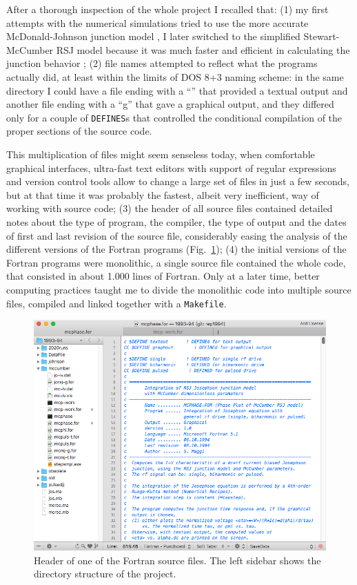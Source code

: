 After a thorough inspection of the whole project I recalled that:
(1) my first attempts with the numerical simulations tried to use the more accurate McDonald-Johnson junction model \cite{McDonald:1976}, I later switched to the simplified Stewart-McCumber RSJ model because it was much faster and efficient in calculating the junction behavior \cite{McCumber:1968, Stewart:1974};
(2) file names attempted to reflect what the programs actually did, at least within the limits of DOS 8+3 naming scheme: in the same directory I could have a file ending with a ``'' that provided a textual output and another file ending with a ``g'' that gave a graphical output, and they differed only for a couple of \texttt{DEFINES}s that controlled the conditional compilation of the proper sections of the source code.

This multiplication of files might seem senseless today, when comfortable graphical interfaces, ultra-fast text editors with support of regular expressions and version control tools allow to change a large set of files in just a few seconds, but at that time it was probably the fastest, albeit very inefficient, way of working with source code;
(3) the header of all source files contained detailed notes about the type of program, the compiler, the type of output and the dates of first and last revision of the source file, considerably easing the analysis of the different versions of the Fortran programs (Fig.~\ref{fig:source-header}); 
(4) the initial versions of the Fortran programs were monolithic, a single source file contained the whole code, that consisted in about 1.000 lines of Fortran. Only at a later time, better computing practices taught me to divide the monolithic code into multiple source files, compiled and linked together with a \texttt{Makefile}.

\begin{figure}[tb]
	\centering
	\includegraphics[width = 0.75 \textwidth]{images/source-header.png}
	\caption{Header of one of the Fortran source files. The left sidebar shows the directory structure of the project.}
	\label{fig:source-header}
\end{figure}



